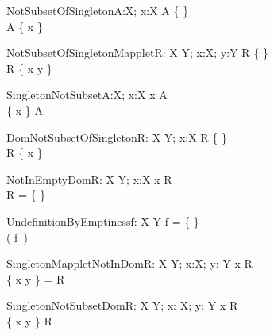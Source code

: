 \begin{theorem}{NotSubsetOfSingleton}{A:\power X; x:X}
A \neq \{ \} \\
A \subset \{ x \} 
\end{theorem}

\begin{theorem}{NotSubsetOfSingletonMapplet}{R: X \rel Y; x:X; y:Y}
R \neq \{ \} \\
\dom R \subset \dom \{ x \mapsto y \} 
\end{theorem}

\begin{theorem}{SingletonNotSubset}{A:\power X; x:X}
x \notin A \\
\{ x \} \subset A
\end{theorem}

\begin{theorem}{DomNotSubsetOfSingleton}{R: X \rel Y; x:X}
R \neq \{ \} \\
\dom R \subset \{ x \} 
\end{theorem}

\begin{theorem}{NotInEmptyDom}{R: X \rel Y; x:X}
x \in \dom R \\
R = \{ \}
\end{theorem}




\begin{theorem}{UndefinitionByEmptiness}{f: X \pfun Y}
f = \{ \} \\
\sw( f~\anything ) \\
\end{theorem}

\begin{theorem}{SingletonMappletNotInDom}{R: X \rel Y; x:X; y: Y}
x \notin \dom R \\
\dom \{ x \mapsto y \} = \dom R
\end{theorem}

\begin{theorem}{SingletonNotSubsetDom}{R: X \rel Y; x: X; y: Y}
x \notin \dom R \\
\dom \{ x \mapsto y \} \subset \dom R
\end{theorem}

